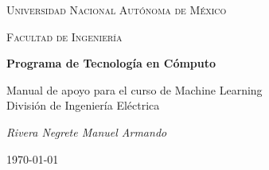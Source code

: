 \begin{minipage}{\textwidth}
	\centering
	\vspace{1.5cm}
	\scshape\LARGE Universidad Nacional Autónoma de México \par
	\vspace{1cm}
	{\scshape\Large Facultad de Ingeniería\par}
	\vspace{0.5cm}
	{\huge\bfseries Programa de Tecnología en Cómputo\\} \vspace{0.5cm} \par 
	Manual de apoyo para el curso de Machine Learning
	\vspace{0.5cm}
	\\\large División de Ingeniería Eléctrica \\
	\vspace{1.5cm}
	{\Large\itshape 
		Rivera Negrete Manuel Armando
		\par}\vfill\vspace{0.35cm}
	\vfill	\vspace{1.25cm}	
	\vfill
	\vspace{2.10cm}
	{\large \today\par}
	\thispagestyle{empty}
\end{minipage}
\newpage